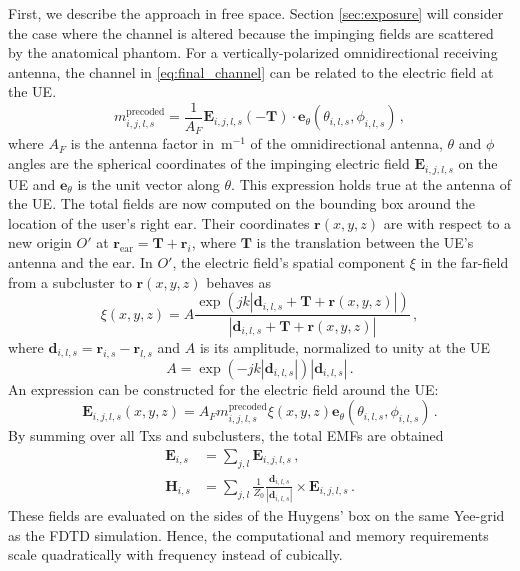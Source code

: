 \documentclass{IEEEtran}
\begin{document}
First, we describe the approach in free space. Section \ref{sec:exposure} will consider the case where the channel is altered because the impinging fields are scattered by the anatomical phantom. For a vertically-polarized omnidirectional receiving antenna, the channel in \eqref{eq:final_channel} can be related to the electric field at the \gls{UE}.
\begin{equation}
\label{eq:channel}
m_{i,j,l,s}^\mathrm{precoded}=\frac{1}{A_F}\mathbf{E}_{i,j,l,s}\left(-\mathbf{T}\right)\cdot\mathbf{e}_\theta\left(\theta_{i,l,s},\phi_{i,l,s}\right) \, , 
\end{equation}
where $A_F$ is the antenna factor in~m$^{-1}$ of the omnidirectional antenna, $\theta$ and $\phi$ angles are the spherical coordinates of the impinging electric field $\mathbf{E}_{i,j,l,s}$ on the \gls{UE} and $\mathbf{e}_\theta$ is the unit vector along $\theta$. This expression holds true at the antenna of the \gls{UE}. The total fields are now computed on the bounding box around the location of the user’s right ear. Their coordinates $\mathbf{r}\left(x,y,z\right)$ are with respect to a new origin $O'$ at $\mathbf{r}_{\mathrm{ear}}=\mathbf{T}+\mathbf{r}_i$, where $\mathbf{T}$ is the translation between the \gls{UE}’s antenna and the ear. In $O'$, the electric field's spatial component $\xi$ in the far-field from a subcluster to $\mathbf{r}\left(x,y,z\right)$ behaves as
\begin{equation}
\label{eq:SEW}
\xi(x,y,z) = A\frac{\exp\left(jk \left|\mathbf{d}_{i,l,s}+\mathbf{T}+\mathbf{r}\left(x,y,z\right)\right|\right)}{\left|\mathbf{d}_{i,l,s}+\mathbf{T}+\mathbf{r}\left(x,y,z\right)\right|} \, ,
\end{equation}
where $\mathbf{d}_{i,l,s} = \mathbf{r}_{i,s}-\mathbf{r}_{l,s}$ and $A$ is its amplitude, normalized to unity at the \gls{UE}
\begin{equation}
\label{eq:A_normalized}
A = \exp\left(-jk\left|\mathbf{d}_{i,l,s}\right| \right) \left|\mathbf{d}_{i,l,s}\right| \, .
\end{equation}
An expression can be constructed for the electric field around the \gls{UE}:
\begin{equation}
\label{eq:E-field}
\mathbf{E}_{i,j,l,s}\left(x,y,z\right)=A_F m_{i,j,l,s}^\mathrm{precoded} \xi(x,y,z)\mathbf{e}_\theta\left(\theta_{i,l,s},\phi_{i,l,s}\right) \, . 
\end{equation}
By summing over all Txs and subclusters, the total \glspl{EMF} are obtained
\begin{equation}
\label{eq:total_EMF}
\begin{aligned}
\mathbf{E}_{i, s}&=\sum_{j, l} \mathbf{E}_{i, j, l, s} \, ,\\
\mathbf{H}_{i, s}&=\sum_{j, l} \frac{1}{Z_0} \frac{\mathbf{d}_{i, l, s}}{\left|\mathbf{d}_{i, l, s}\right|} \times \mathbf{E}_{i, j, l, s} \, .
\end{aligned}
\end{equation}
These fields are evaluated on the sides of the Huygens' box on the same Yee-grid as the FDTD simulation. Hence, the computational and memory requirements scale quadratically with frequency instead of cubically. 
\end{document}
